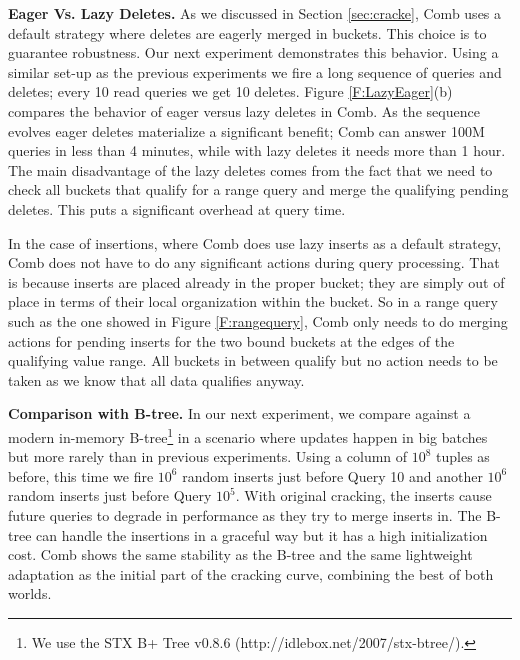 \textbf{Eager Vs. Lazy Deletes.}
As we discussed in Section \ref{sec:cracke}, Comb uses a default strategy where deletes are eagerly merged
in buckets. This choice is to guarantee robustness.
Our next experiment demonstrates this behavior. 
Using a similar set-up as the previous experiments we fire a long  sequence of queries and deletes;
every 10 read queries we get 10 deletes.
Figure \ref{F:LazyEager}(b) compares the behavior of eager versus lazy deletes in Comb. 
As the sequence evolves eager deletes materialize a significant benefit;
Comb can answer 100M queries in less than 4 minutes, while with lazy deletes it needs more than 1 hour.
The main disadvantage of the lazy deletes comes from the fact that we need to check all buckets
that qualify for a range query and merge the qualifying pending deletes. This puts a significant overhead at query time. 

In the case of insertions, where Comb does use lazy inserts as a default strategy, Comb does not have to do any significant
actions during query processing. That is because inserts are placed already in the proper bucket;
they are simply out of place in terms of their local organization within the bucket.
So in a range query such as the one showed in Figure \ref{F:rangequery}, Comb only needs
to do merging actions for pending inserts for the two bound buckets at the edges of the qualifying value range. 
All buckets in between qualify but no action needs to be taken as we know that all data qualifies anyway.






\textbf{Comparison with B-tree.}
In our next experiment, we compare against a modern in-memory B-tree\footnote{\small We use the STX B+ Tree v0.8.6 (http://idlebox.net/2007/stx-btree/).} 
in a scenario where updates happen in big batches but more rarely than in previous experiments.
Using a column of $10^8$ tuples as before, this time we fire $10^6$ random inserts
just before Query 10 and another  $10^6$ random inserts just before Query $10^5$.
With original cracking, the inserts cause future queries to degrade in performance 
as they try to merge inserts in. The B-tree can handle the insertions in a graceful way
but it has a high initialization cost. 
Comb shows the same stability as the B-tree and the same lightweight adaptation as the
initial part of the cracking curve, combining the best of both worlds.  




